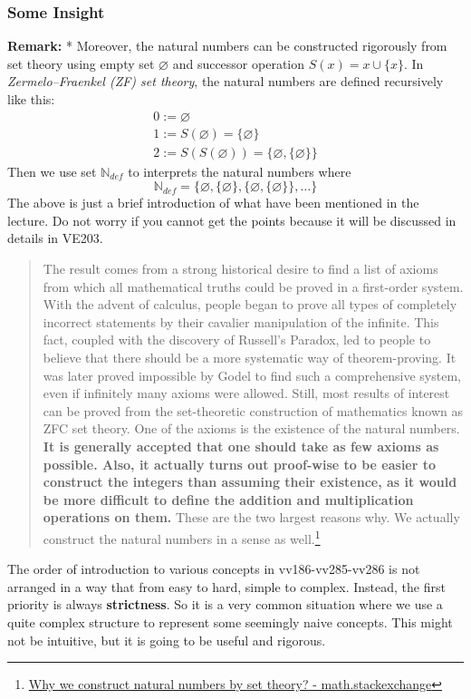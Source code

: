 \documentclass[10pt, t]{beamer}
\newcommand{\N}{\mathbb{N}}
\renewcommand{\emptyset}{\varnothing}
\begin{document}
\begin{frame}[allowframebreaks]
    \frametitle{Some Insight}

    \textbf{Remark:} * Moreover, the natural numbers can be constructed rigorously from set theory using empty set $\emptyset$ and successor operation $S(x)=x\cup \{x\}$. In \textit{Zermelo–Fraenkel (ZF) set theory}, the natural numbers are defined recursively like this:
    $$\begin{array}{l}
        0:=\emptyset \\
        1:=S(\emptyset)=\{\emptyset\} \\
        2:=S(S(\emptyset))=\{\emptyset,\{\emptyset\}\}
        \end{array}$$
    Then we use set $\N_{def }$ to interprets the natural numbers where
    $$\mathbb{N}_{def}=\{\emptyset,\{\emptyset\},\{\emptyset,\{\emptyset\}\}, \ldots\}$$
    The above is just a brief introduction of what have been mentioned in the lecture. Do not worry if you cannot get the points because it will be discussed in details in VE203.
    \newpage
    \begin{quote}
        The result comes from a strong historical desire to find a list of axioms from which all mathematical truths could be proved in a first-order system. With the advent of calculus, people began to prove all types of completely incorrect statements by their cavalier manipulation of the infinite. This fact, coupled with the discovery of Russell's Paradox, led to people to believe that there should be a more systematic way of theorem-proving. It was later proved impossible by Godel to find such a comprehensive system, even if infinitely many axioms were allowed. Still, most results of interest can be proved from the set-theoretic construction of mathematics known as ZFC set theory. One of the axioms is the existence of the natural numbers. \textbf{It is generally accepted that one should take as few axioms as possible. Also, it actually turns out proof-wise to be easier to construct the integers than assuming their existence, as it would be more difficult to define the addition and multiplication operations on them.} These are the two largest reasons why. We actually construct the natural numbers in a sense as well.\footnote[frame]{\href{https://math.stackexchange.com/questions/2537487/what-is-the-benefit-in-constructing-the-integers-from-natural-numbers}{Why we construct natural numbers by set theory? - math.stackexchange}}
    \end{quote}
    \newpage
    The order of introduction to various concepts in vv186-vv285-vv286 is not arranged in a way that from easy to hard, simple to complex. Instead, the first priority is always \textbf{strictness}. So it is a very common situation where we use a quite complex structure to represent some seemingly naive concepts. This might not be intuitive, but it is going to be useful and rigorous.

\end{frame}
\end{document}

